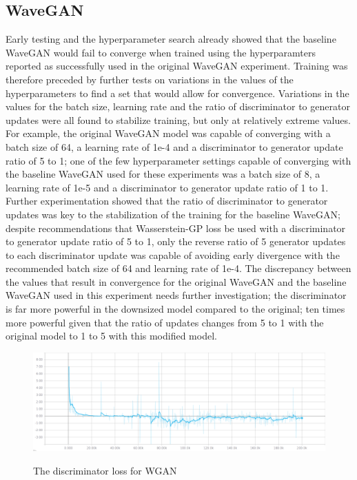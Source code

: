 \documentclass[a4paper, titlepage]{article}
\begin{document}
\subsection{WaveGAN}

Early testing and the hyperparameter search already showed that the baseline WaveGAN would fail to converge when trained using the hyperparamters reported as successfully used in the original WaveGAN experiment.
Training was therefore preceded by further tests on variations in the values of the hyperparameters to find a set that would allow for convergence.
\newline
\newline
Variations in the values for the batch size, learning rate and the ratio of discriminator to generator updates were all found to stabilize training, but only at relatively extreme values.
For example, the original WaveGAN model was capable of converging with a batch size of 64, a learning rate of 1e-4 and a discriminator to generator update ratio of 5 to 1; one of the few hyperparameter settings capable of converging with the baseline WaveGAN used for these experiments was a batch size of 8, a learning rate of 1e-5 and a discriminator to generator update ratio of 1 to 1.
\newline
\newline
Further experimentation showed that the ratio of discriminator to generator updates was key to the stabilization of the training for the baseline WaveGAN; despite recommendations that Wasserstein-GP loss be used with a discriminator to generator update ratio of 5 to 1, only the reverse ratio of 5 generator updates to each discriminator update was capable of avoiding early divergence with the recommended batch size of 64 and learning rate of 1e-4.
\newline
\newline
The discrepancy between the values that result in convergence for the original WaveGAN and the baseline WaveGAN used in this experiment needs further investigation; the discriminator is far more powerful in the downsized model compared to the original; ten times more powerful given that the ratio of updates changes from 5 to 1 with the original model to 1 to 5 with this modified model.
\newline
%
\begin{figure}[ht]%
  \caption{The discriminator loss for WGAN}
  \centering
  \includegraphics[width=1\textwidth, clip]{WGAN-Dis-Loss}
  \label{fig:WGAN-Dis-Loss}%
\end{figure}
\end{document}
